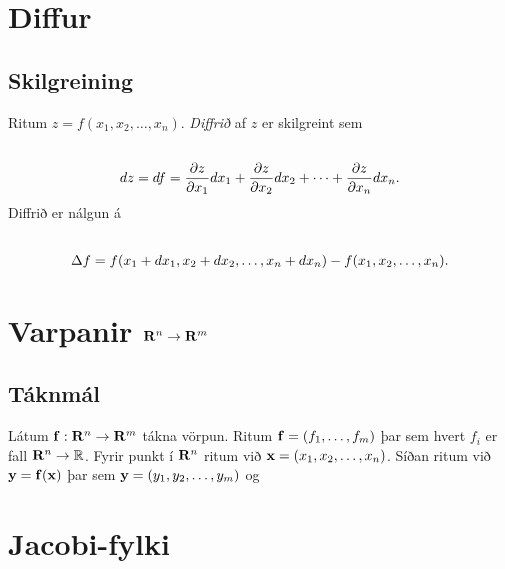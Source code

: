 \documentclass[a4paper,10pt,icelandic]{sphinxmanual}
\begin{document}
\section{Diffur}
\label{Kafli2:diffur}

\subsection{Skilgreining}
\label{Kafli2:index-18}\label{Kafli2:id37}
Ritum \(z=f(x_1, x_2, \ldots, x_n)\). \textit{Diffrið} af \(z\) er
skilgreint sem
\begin{gather}
\begin{split}\displaystyle\end{split}\notag\\\begin{split}dz=df=\frac{\partial z}{\partial x_1}dx_1
+\frac{\partial z}{\partial x_2}dx_2
+\cdots+\frac{\partial z}{\partial x_n}dx_n.\end{split}\notag
\end{gather}
Diffrið er nálgun á
\begin{gather}
\begin{split}\displaystyle\end{split}\notag\\\begin{split}\Delta f=f(x_1+dx_1, x_2+dx_2,\ldots,
x_n+dx_n)-f(x_1,x_2,\ldots,x_n).\end{split}\notag
\end{gather}

\section{Varpanir \(\mbox{${\bf R}^n$}\rightarrow\mbox{${\bf R}^m$}\)}
\label{Kafli2:varpanir}

\subsection{Táknmál}
\label{Kafli2:taknmal}
Látum
\(\mbox{${\bf f}$}:\mbox{${\bf R}^n$}\rightarrow\mbox{${\bf R}^m$}\)
tákna vörpun. Ritum \(\mbox{${\bf f}$}=(f_1,\ldots,f_m)\) þar sem
hvert \(f_i\) er fall
\(\mbox{${\bf R}^n$}\rightarrow{\mathbb  R}\). Fyrir punkt í
\(\mbox{${\bf R}^n$}\) ritum við
\(\mbox{${\bf x}$}=(x_1,x_2,\ldots,x_n)\). Síðan ritum við
\(\mbox{${\bf y}$}=\mbox{${\bf f}$}(\mbox{${\bf x}$})\) þar sem
\(\mbox{${\bf y}$}=(y_1,y_2,\ldots,y_m)\) og


\section{Jacobi-fylki}
\label{Kafli2:jacobi-fylki}
\end{document}

